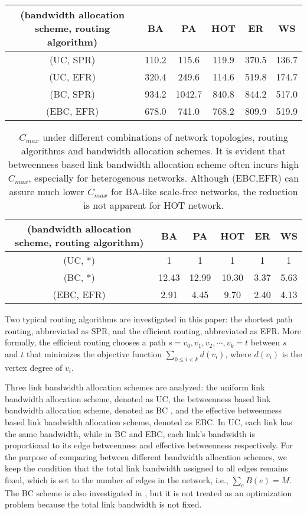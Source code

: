\documentclass[journal]{IEEEtran}
\begin{document}
{\begin{table*}[!t]
\begin{tabular}{c|ccccc}
(bandwidth allocation scheme, routing algorithm) & BA & PA & HOT & ER &WS\\
\hline \hline

(UC, SPR)  & 110.2 & 115.6  & 119.9  & 370.5 & 136.7 \\
(UC, EFR)  & 320.4 & 249.6  & 114.6  & 519.8 & 174.7 \\
 (BC, SPR) & 934.2 & 1042.7 & 840.8  & 844.2 & 517.0 \\
 (EBC, EFR)& 678.0 & 741.0  & 768.2  & 809.9 & 519.9 \\
 \hline
\end{tabular}
\end{table*}


\begin{table*}[!t]
\centering \caption{$C_{max}$ under different combinations of
network topologies, routing algorithms and bandwidth allocation
schemes. It is evident that betweenness based link bandwidth
allocation scheme often incurs high $C_{max}$, especially for
heterogenous networks. Although (EBC,EFR) can assure much lower
$C_{max}$ for BA-like scale-free networks, the reduction is not
apparent for HOT network. }  \label{max_capability}
\begin{tabular}{c|ccccc}
\hline

(bandwidth allocation scheme, routing algorithm) & BA & PA & HOT &
ER & WS \\
\hline \hline

(UC, *)   & 1     & 1     & 1     & 1     & 1 \\
(BC, *)   & 12.43 & 12.99 & 10.30 & 3.37  & 5.63\\
(EBC, EFR)& 2.91  & 4.45  & 9.70  & 2.40  & 4.13\\

 \hline
\end{tabular}
\end{table*}

Two typical routing algorithms are investigated in this paper: the
shortest path routing, abbreviated as SPR, and the efficient
routing\cite{efficient-routing}, abbreviated as EFR. More formally,
the efficient routing chooses a path $s=v_0,v_1,v_2,\cdots,v_k=t$
between $s$ and $t$ that minimizes the objective function
$\sum_{0\leq i<k}d(v_i)$, where $d(v_i)$ is the vertex degree of
$v_i$.

Three link bandwidth allocation schemes are analyzed: the uniform
link bandwidth allocation scheme, denoted as UC, the betweenness
based link bandwidth allocation scheme, denoted as BC , and the
effective betweenness based link bandwidth allocation scheme,
denoted as EBC. In UC, each link has the same bandwidth, while in BC
and EBC, each link's bandwidth is proportional to its edge
betweenness and effective betweenness respectively. For the purpose
of comparing between different bandwidth allocation schemes, we keep
the condition that the total link bandwidth assigned to all edges
remains fixed, which is set to the number of edges in the network,
i.e., $\sum_eB(e)=M$. The BC scheme is also investigated in
\cite{onset-traffic-congestion}, but it is not treated as an
optimization problem because the total link bandwidth is not fixed.

}
\end{document}
